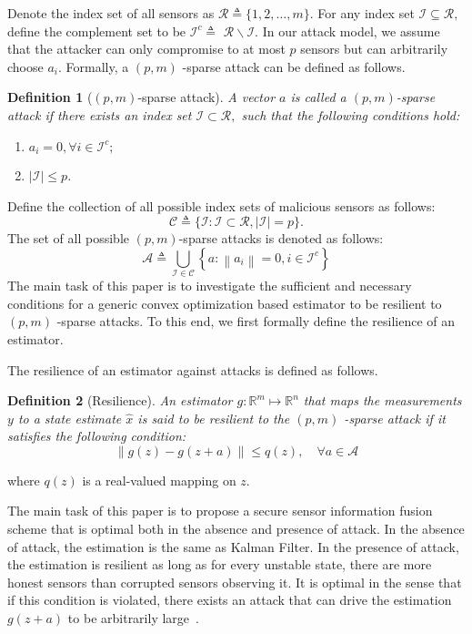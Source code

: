 \documentclass[journal]{IEEEtran}
\newcommand{\Cc}{{\mathcal{C}}}
\newcommand{\Ic}{{\mathcal{I}}}
\newcommand{\Rc}{{\mathcal{R}}}
\newtheorem{definition}{\textbf{Definition}}
\begin{document}
	Denote the index set of all sensors as $\Rc \triangleq\{1,2, \ldots, m\}$. 
	For any index set $\Ic \subseteq \Rc,$ define the complement set to be $\Ic^{c} \triangleq$ $\Rc \backslash \Ic$. 
	In our attack model, we assume that the attacker can only compromise to at most $p$ sensors but can arbitrarily choose $a_{i}$. Formally, a $(p, m)$ -sparse attack can be defined as follows. 
	\begin{definition}[$(p, m)$-sparse attack]
		A vector $a$ is called a $(p, m)$-sparse attack if there exists an index set $\Ic \subset \mathcal{R},$ such that the following conditions hold:
		\begin{enumerate}
			\item $a_{i}=0, \forall i \in \Ic^{c} ;$
			\item $|\Ic| \leq p$. 
		\end{enumerate}
		
	\end{definition}
	Define the collection of all possible index sets of malicious sensors as follows:
	$$
	\Cc \triangleq\{\Ic: \Ic \subset \Rc,|\Ic|=p\}.
	$$
	The set of all possible $(p, m)$-sparse attacks is denoted as follows:
	$$
	\mathcal{A} \triangleq \bigcup_{\Ic \in \Cc}\left\{a:\left\|a_{i}\right\|=0, i \in \Ic^{c}\right\}
	$$
	The main task of this paper is to investigate the sufficient and necessary conditions for a generic convex optimization based estimator to be resilient to $(p, m)$ -sparse attacks. To this end, we first formally define the resilience of an estimator.
	
	The resilience of an estimator against attacks is defined as follows.
	\begin{definition}[Resilience]
		An estimator $g: \mathbb{R}^{m} \mapsto \mathbb{R}^{n}$ that maps the measurements $y$ to a state estimate $\hat{x}$ is said to be resilient to the $(p, m)$ -sparse attack if it satisfies the following condition:
		$$
		\|g(z)-g(z+a)\| \leq q(z), \quad \forall a \in \mathcal{A}
		$$
	\end{definition}
	where $q(z)$ is a real-valued mapping on $z$.
	
	The main task of this paper is to propose a secure sensor information fusion scheme that is optimal both in the absence and presence of attack.
	In the absence of attack, the estimation is the same as Kalman Filter. In the presence of attack, the estimation is resilient as long as for every unstable state, there are more honest sensors than corrupted sensors observing it. It is optimal in the sense that if this condition is violated, there exists an attack that can drive the estimation $g(z+a)$ to be arbitrarily large~\cite{yorie}.
	
\end{document}
